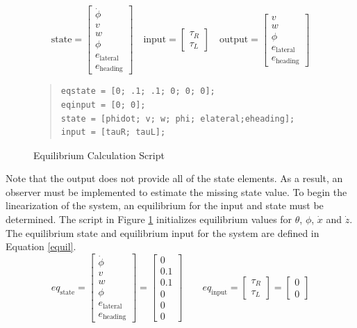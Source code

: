 \documentclass[12pt]{article}
\begin{document}
\begin{equation}
\label{sys}
\textrm{state} = 
\begin{bmatrix}
\dot{\phi} \\ v \\ w \\ \phi \\ e_\text{lateral} \\ e_\text{heading}
\end{bmatrix}
\quad
\textrm{input} = 
\begin{bmatrix}
\tau_{R} \\ \tau_{L}
\end{bmatrix}
\quad
\textrm{output} = 
\begin{bmatrix}
v \\ w \\ \phi \\ e_\text{lateral} \\ e_\text{heading}
\end{bmatrix}
\end{equation}

\begin{figure}
\begin{quote}
\begin{lstlisting}
eqstate = [0; .1; .1; 0; 0; 0];
eqinput = [0; 0];
state = [phidot; v; w; phi; elateral;eheading];
input = [tauR; tauL];
\end{lstlisting}
\end{quote}
\caption{Equilibrium Calculation Script\label{fig:equill}}
\end{figure}

Note that the output does not provide all of the state elements. As a result, an observer must be implemented to estimate the missing state value. To begin the linearization of the system, an equilibrium for the input and state must be determined. The script in Figure \ref{fig:equill} initializes equilibrium values for $\theta$, $\phi$, $\dot{x}$ and $\dot{z}$. The equilibrium state and equilibrium input for the system are defined in Equation \eqref{equil}.
\begin{equation}
\label{equil}
eq_{\textrm{state}} = 
\begin{bmatrix}
\dot{\phi} \\ v \\ w \\ \phi \\ e_\text{lateral} \\ e_\text{heading}
\end{bmatrix}
= 
\begin{bmatrix}
0 \\ 0.1 \\ 0.1 \\ 0 \\ 0 \\ 0
\end{bmatrix}
\qquad
eq_{\textrm{input}} = 
\begin{bmatrix}
\tau_{R} \\ \tau_{L}
\end{bmatrix}
=
\begin{bmatrix}
0 \\ 0
\end{bmatrix}
\end{equation}
\end{document}
